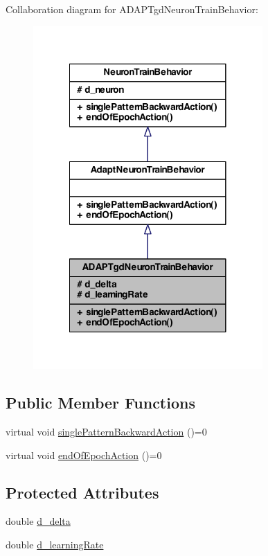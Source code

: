 Collaboration diagram for ADAPTgdNeuronTrainBehavior:
\nopagebreak
\begin{figure}[H]
\begin{center}
\leavevmode
\includegraphics[width=248pt]{class_a_d_a_p_tgd_neuron_train_behavior__coll__graph}
\end{center}
\end{figure}
\subsection*{Public Member Functions}
\begin{DoxyCompactItemize}
\item 
virtual void \hyperlink{class_a_d_a_p_tgd_neuron_train_behavior_a517162e38c48a87bf26aa01bfcecffa3}{singlePatternBackwardAction} ()=0
\item 
virtual void \hyperlink{class_a_d_a_p_tgd_neuron_train_behavior_a8d352ce9e885ded4e7c2294eaf49e266}{endOfEpochAction} ()=0
\end{DoxyCompactItemize}
\subsection*{Protected Attributes}
\begin{DoxyCompactItemize}
\item 
double \hyperlink{class_a_d_a_p_tgd_neuron_train_behavior_a19c5795f7e290231a24ec12e72544167}{d\_\-delta}
\item 
double \hyperlink{class_a_d_a_p_tgd_neuron_train_behavior_a6b1b79bde42df989cab2a92785801103}{d\_\-learningRate}
\end{DoxyCompactItemize}


